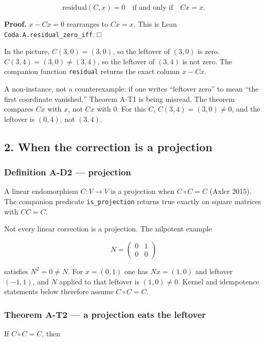 \documentclass[
  11pt,
]{article}
\begin{document}
\[
\mathrm{residual}(C,x)=0
\quad\text{if and only if}\quad
Cx=x.
\]

\textbf{Proof.} \(x-Cx=0\) rearranges to \(Cx=x\). This is Lean \nolinkurl{Coda.A.residual_zero_iff}. □

In the picture, \(C(3,0)=(3,0)\), so the leftover of \((3,0)\) is zero. \(C(3,4)=(3,0)\neq(3,4)\), so the leftover of \((3,4)\) is not zero. The companion function \texttt{residual} returns the exact column \(x-Cx\).

A non-instance, not a counterexample: if one writes ``leftover zero'' to mean ``the first coordinate vanished,'' Theorem A-T1 is being misread. The theorem compares \(Cx\) with \(x\), not \(Cx\) with \(0\). For this \(C\), \(C(3,4)=(3,0)\neq 0\), and the leftover is \((0,4)\), not \((3,4)\).

\subsection{2. When the correction is a projection}\label{when-the-correction-is-a-projection}

\subsubsection{Definition A-D2 --- projection}\label{definition-a-d2-projection}

A linear endomorphism \(C:V\to V\) is a projection when \(C\circ C=C\) (Axler 2015). The companion predicate \texttt{is\_projection} returns true exactly on square matrices with \(CC=C\).

Not every linear correction is a projection. The nilpotent example

\[
N
=
\begin{pmatrix}0&1\\0&0\end{pmatrix}
\]

satisfies \(N^2=0\neq N\). For \(x=(0,1)\) one has \(Nx=(1,0)\) and leftover \((-1,1)\), and \(N\) applied to that leftover is \((1,0)\neq 0\). Kernel and idempotence statements below therefore assume \(C\circ C=C\).

\subsubsection{Theorem A-T2 --- a projection eats the leftover}\label{theorem-a-t2-a-projection-eats-the-leftover}

If \(C\circ C=C\), then
\end{document}
